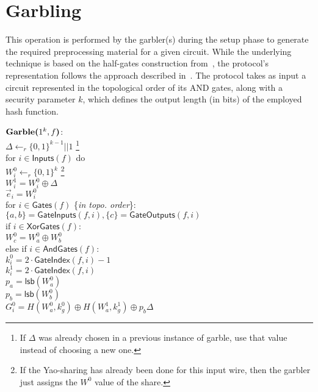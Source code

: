 \section{Garbling}

This operation is performed by the garbler(s) during the setup phase to generate the required preprocessing material for a given circuit. While the underlying technique is based on the half-gates construction from~\cite{EC:ZahRosEva15}, the protocol’s representation follows the approach described in~\cite{EPRINT:GYWYL23}. The protocol takes as input a circuit represented in the topological order of its AND gates, along with a security parameter $k$, which defines the output length (in bits) of the employed hash function.

\begin{protocol}[Garble]	
	$\textbf{Garble(}1^k, f\textbf{)}$:\\
	\indent $\Delta \gets_r \{0,1\}^{k-1} || 1$ \footnote{If $\Delta$ was already chosen in a previous instance of garble, use that value instead of choosing a new one.} \\
	\indent for $i \in \textsf{Inputs}(f)$  do\\
	\indent \indent  $W_i^0 \gets_r \{0,1\}^k$ \footnote{If the Yao-sharing has already been done for this input wire, then the garbler just assigns the $W^0$ value of the share.} \\
	\indent \indent  $W_i^1 = W_i^0 \oplus \Delta$ \\
	\indent \indent  $\vec{e}_i = W_i^0$ \\
	\indent for $i \in \textsf{Gates}(f)$  \{\textit{in topo. order}\}:\\
	\indent \indent  $\{a, b\} = \textsf{GateInputs}(f, i), \{c\} = \textsf{GateOutputs}(f, i)$ \\
	\indent \indent  if $i \in \textsf{XorGates}(f)$:\\
	\indent \indent \indent  $W_c^0 = W_a^0 \oplus W_b^0$ \\
	\indent \indent  else if $i \in \textsf{AndGates}(f)$:\\
	\indent \indent \indent $k_i^0 = 2 \cdot \textsf{GateIndex}(f, i) - 1$\\
	\indent \indent \indent $k_i^1 = 2 \cdot \textsf{GateIndex}(f, i)$ \\
	\indent \indent \indent $p_a = \textsf{lsb}(W_a^0)$ \\
	\indent \indent \indent $p_b = \textsf{lsb}(W_b^0)$ \\
	\indent \indent \indent $G_i^0 = H(W_a^0, k_g^0) \oplus H(W_a^1, k_g^1) \oplus p_b \Delta$ \\

\end{protocol}
